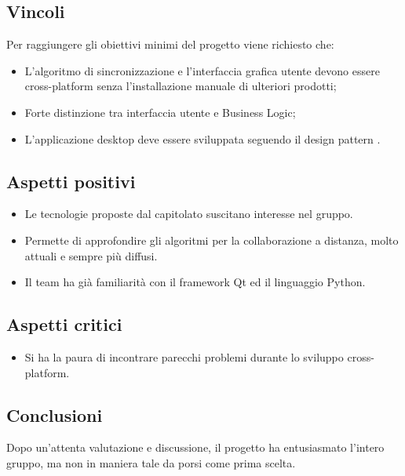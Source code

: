 \subsection{Vincoli}
Per raggiungere gli obiettivi minimi del progetto viene richiesto che:
\begin{itemize}
	\item L'algoritmo di sincronizzazione e l'interfaccia grafica utente devono essere cross-platform senza l'installazione manuale di ulteriori prodotti;
	\item Forte distinzione tra interfaccia utente e Business Logic;
	\item L'applicazione desktop deve essere sviluppata seguendo il design pattern .
\end{itemize}

\subsection{Aspetti positivi}
\begin{itemize}
	\item Le tecnologie proposte dal capitolato suscitano interesse nel gruppo.
	\item Permette di approfondire gli algoritmi per la collaborazione a distanza, molto attuali e sempre più diffusi.
	\item Il team ha già familiarità con il framework Qt ed il linguaggio Python.
\end{itemize}

\subsection{Aspetti critici}
\begin{itemize}
	\item Si ha la paura di incontrare parecchi problemi durante lo sviluppo cross-platform.
\end{itemize}

\subsection{Conclusioni}
Dopo un'attenta valutazione e discussione, il progetto ha entusiasmato l'intero gruppo, ma non in maniera tale da porsi come prima scelta.
